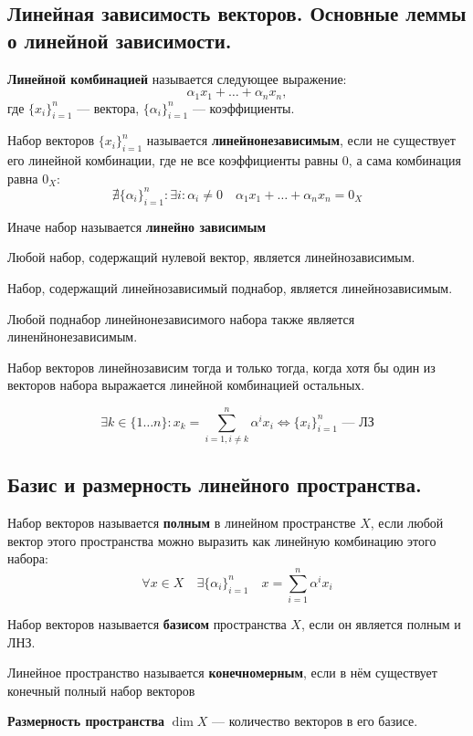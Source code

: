 \subsection{Линейная зависимость векторов. Основные леммы о линейной зависимости.}
\begin{definition}
    \textbf{Линейной комбинацией} называется следующее выражение: $$\alpha_1x_1+\ldots+\alpha_nx_n,$$ где $\{x_i\}_{i=1}^n$ --- вектора, $\{\alpha_i\}_{i=1}^n$ --- коэффициенты.
\end{definition}
\begin{definition}
    Набор векторов $\{x_i\}_{i=1}^n$ называется \textbf{линейнонезависимым}, если не существует его линейной комбинации, где не все коэффициенты равны $0$, а сама комбинация равна $0_X$:
    $$\nexists \{\alpha_i\}_{i=1}^n : \exists i : \alpha_i\not=0 \quad \alpha_1x_1+\ldots+\alpha_nx_n=0_X$$

    Иначе набор называется \textbf{линейно зависимым}
\end{definition}
\begin{lemma}
    Любой набор, содержащий нулевой вектор, является линейнозависимым.
\end{lemma}
\begin{lemma}
    Набор, содержащий линейнозависимый поднабор, является линейнозависимым.
\end{lemma}
\begin{lemma}
    Любой поднабор линейнонезависимого набора также является линенйнонезависимым.
\end{lemma}
\begin{lemma}
    Набор векторов линейнозависим тогда и только тогда, когда хотя бы один из векторов набора выражается линейной комбинацией остальных.

    $$\exists k\in\{1\ldots n\}: x_k=\sum\limits_{i=1, i\not=k}^n\alpha^ix_i \Leftrightarrow \{x_i\}_{i=1}^n \text{ --- ЛЗ}$$
\end{lemma}
\subsection{Базис и размерность линейного пространства.}
\begin{definition}
    Набор векторов называется \textbf{полным} в линейном пространстве $X$, если любой вектор этого пространства можно выразить как линейную комбинацию этого набора:
    $$\forall x\in X \quad \exists \{\alpha_i\}_{i=1}^n \quad x=\sum\limits_{i=1}^n\alpha^ix_i$$
\end{definition}
\begin{definition}
    Набор векторов называется \textbf{базисом} пространства $X$, если он является полным и ЛНЗ.
\end{definition}
\begin{definition}
    Линейное пространство называется \textbf{конечномерным}, если в нём существует конечный полный набор векторов
\end{definition}
\begin{definition}
    \textbf{Размерность пространства} $\dim X$ --- количество векторов в его базисе.
\end{definition}
